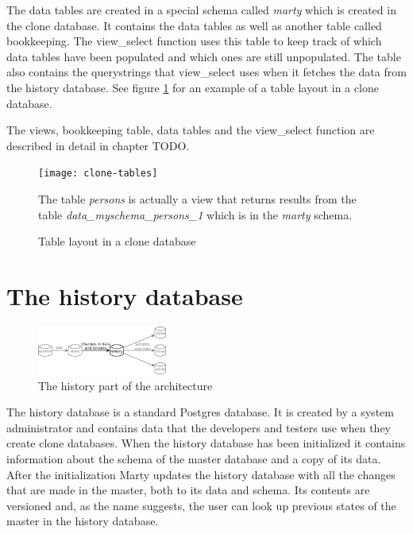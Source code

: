 The data tables are created in a special schema called \textit{marty} which is created in the clone database.
It contains the data tables as well as another table called bookkeeping.
The view\_select function uses this table to keep track of which data tables have been populated and which ones are still unpopulated.
The table also contains the querystrings that view\_select uses when it fetches the data from the history database.
See figure \ref{clone-tables} for an example of a table layout in a clone database.

The views, bookkeeping table, data tables and the view\_select function are described in detail in chapter TODO.

\begin{figure}[h!]
  \centering
    \texttt{[image: clone-tables]}
  \caption{Table layout in a clone database}
  \medskip
  \small
  The table \textit{persons} is actually a view that returns results from the table \textit{data\_myschema\_persons\_1} which is in the \textit{marty} schema.
  \label{clone-tables}
\end{figure}

\section{The history database}

\begin{figure}
  \vspace{-20pt}
  \begin{center}
    \includegraphics[width=0.38\textwidth]{img/architecture-history}
  \end{center}
  \vspace{-20pt}
  \caption{The history part of the architecture}
  \vspace{-10pt}
\end{figure}

The history database is a standard Postgres database.
It is created by a system administrator and contains data that the developers and testers use when they create clone databases.
When the history database has been initialized it contains information about the schema of the master database and a copy of its data.
After the initialization Marty updates the history database with all the changes that are made in the master, both to its data and schema.
Its contents are versioned and, as the name suggests, the user can look up previous states of the master in the history database.

